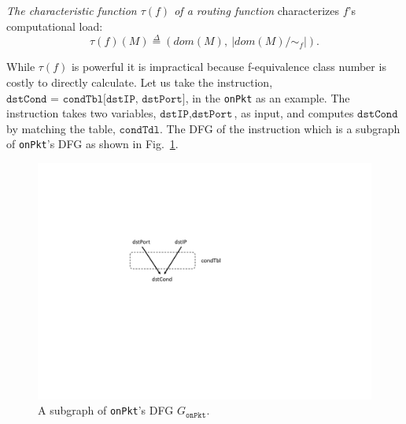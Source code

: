 
\begin{definition} {\em The characteristic function $\tau(f)$ of a routing function} characterizes $f$'s computational load:
\begin{equation*}
\tau(f)(M) \overset{\Delta}{=} (dom(M),\ |dom(M)/\sim_f|).
\end{equation*}
\end{definition}





While $\tau(f)$ is powerful it is impractical because f-equivalence class number is costly to directly calculate. Let us take the instruction, $\texttt{dstCond = condTbl[dstIP, dstPort]}$, in the \texttt{onPkt} as an example. The instruction takes two variables, $\texttt{dstIP}, \texttt{dstPort}$, as input, and computes $\texttt{dstCond}$ by matching the table, $\texttt{condTdl}$. The DFG of the instruction which is a subgraph of \texttt{onPkt}'s DFG as shown in Fig.~\ref{fig:onpkt-dfg-subgraph}.

\begin{figure}[tbh]
    \centering
    \vspace{-1mm}
    \includegraphics[scale = 0.6]{figures/figure-subgraph.pdf}
    \vspace{-2mm}
    \caption{A subgraph of \texttt{onPkt}'s DFG $G_{\texttt{onPkt}}$.}
    \label{fig:onpkt-dfg-subgraph}
    \vspace{-2mm}
\end{figure}

